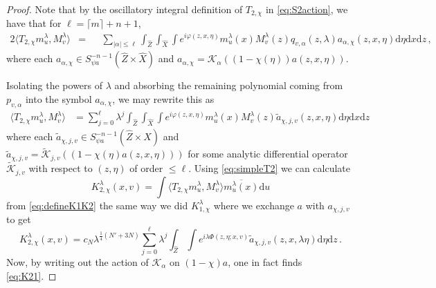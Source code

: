 \documentclass[
	fontsize=11pt, 
	twoside=false, 
	abstract=true, 
	a4paper,
]{scrartcl}
\newcommand{\dd}{\mathrm{d}}
\newcommand{\abs}[1]{\left\lvert#1\right\rvert}
\newcommand{\del}{\partial}
\newcommand{\td}[1]{\tilde{#1}}
\begin{document}
\begin{proof}
	Note that by the oscillatory integral definition of $T_{2,\chi}$ in \cref{eq:S2action}, we have that for $\ell = \lceil m \rceil + n + 1$,
	\begin{alignat*}{2}
		\langle T_{2,\chi}m_u^\lambda, M_v^\lambda \rangle &= &&\sum_{\abs{\alpha}\leq \ell}\int_{\hat Z}\int_{\hat X}\int e^{i\varphi(z,x,\eta)}  m_u^\lambda(x)M_v^\lambda(z) q_{v,\alpha}(z,\lambda) a_{\alpha,\chi}(z,x,\eta) \dd \eta \dd x \dd z\,,%
	\end{alignat*}
	where each $a_{\alpha,\chi} \in S^{-n-1}_{\psi a}(\hat Z \times \hat X)$ and $a_{\alpha,\chi} = \mathcal{K}_\alpha((1-\chi(\eta))a(z,x,\eta))$.

	Isolating the powers of $\lambda$ and absorbing the remaining polynomial coming from $p_{v,\alpha}$ into the symbol $a_{\alpha,\chi}$, we may rewrite this as 	
	\begin{equation}\label{eq:simpleT2}
	\begin{aligned}
		\langle T_{2,\chi}m_u^\lambda, M_v^\lambda \rangle &= \sum_{j=0}^\ell \lambda^j \int_{\hat Z}\int_{\hat X}\int e^{i\varphi(z,x,\eta)}  m_u^\lambda(x)M_v^\lambda(z) \td{a}_{\chi,j,v}(z,x,\eta) \dd \eta \dd x \dd z %
	\end{aligned}
\end{equation}
	where each $\td{a}_{\chi,j,v} \in S^{-n-1}_{\psi a}(\hat Z\times\hat X)$ and $\td{a}_{\chi,j,v} = \td{\mathcal{K}}_{j,v}((1-\chi(\eta)a(z,x,\eta)))$ for some analytic differential operator $\td{\mathcal{K}}_{j,v}$ with respect to $(z,\eta)$ of order $\leq \ell$. 
	Using \cref{eq:simpleT2} we can calculate
	\[
		K_{2,\chi}^\lambda(x,v) = \int \langle T_{2,\chi} m_u^\lambda, M_v^\lambda\rangle \overline{m_u^\lambda(x)}\dd u
	\]
	from \cref{eq:defineK1K2} the same way we did $K_{1,\chi}^\lambda$ where we exchange $a$ with $a_{\chi,j,v}$ to get 
	\begin{equation*}%
		K_{2,\chi}^\lambda(x,v) = c_{N}\lambda^{\frac{1}{4}(N'+3N)}\sum_{j=0}^{\ell} \lambda^j \int_{\hat Z}\int e^{i\lambda\Phi(z,\eta;x,v)} \td{a}_{\chi,j,v}(z,x,\lambda\eta)\dd\eta\dd z\,.
	\end{equation*}
	Now, by writing out the action of $\mathcal{K}_\alpha$ on $(1-\chi)a$, one in fact finds \cref{eq:K21}.
\end{proof}
\end{document}
